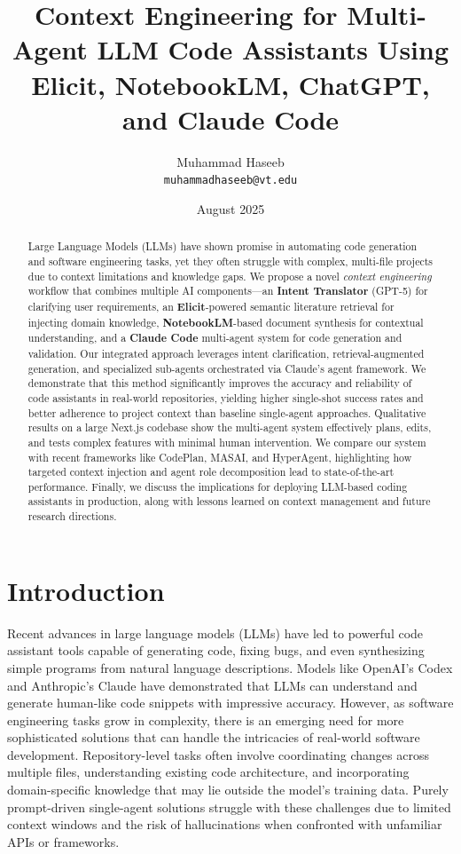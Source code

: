 \documentclass[11pt]{article}
\title{Context Engineering for Multi-Agent LLM Code Assistants Using Elicit, NotebookLM, ChatGPT, and Claude Code}
\author{Muhammad Haseeb\\
\texttt{muhammadhaseeb@vt.edu}}
\date{August 2025}
\begin{document}
\maketitle

\begin{abstract}
Large Language Models (LLMs) have shown promise in automating code generation and software engineering tasks, yet they often struggle with complex, multi-file projects due to context limitations and knowledge gaps. We propose a novel \textit{context engineering} workflow that combines multiple AI components—an \textbf{Intent Translator} (GPT-5) for clarifying user requirements, an \textbf{Elicit}-powered semantic literature retrieval for injecting domain knowledge, \textbf{NotebookLM}-based document synthesis for contextual understanding, and a \textbf{Claude Code} multi-agent system for code generation and validation. Our integrated approach leverages intent clarification, retrieval-augmented generation, and specialized sub-agents orchestrated via Claude's agent framework. We demonstrate that this method significantly improves the accuracy and reliability of code assistants in real-world repositories, yielding higher single-shot success rates and better adherence to project context than baseline single-agent approaches. Qualitative results on a large Next.js codebase show the multi-agent system effectively plans, edits, and tests complex features with minimal human intervention. We compare our system with recent frameworks like CodePlan, MASAI, and HyperAgent, highlighting how targeted context injection and agent role decomposition lead to state-of-the-art performance. Finally, we discuss the implications for deploying LLM-based coding assistants in production, along with lessons learned on context management and future research directions.
\end{abstract}

\section{Introduction}
Recent advances in large language models (LLMs) have led to powerful code assistant tools capable of generating code, fixing bugs, and even synthesizing simple programs from natural language descriptions. Models like OpenAI's Codex and Anthropic's Claude have demonstrated that LLMs can understand and generate human-like code snippets with impressive accuracy. However, as software engineering tasks grow in complexity, there is an emerging need for more sophisticated solutions that can handle the intricacies of real-world software development. Repository-level tasks often involve coordinating changes across multiple files, understanding existing code architecture, and incorporating domain-specific knowledge that may lie outside the model's training data. Purely prompt-driven single-agent solutions struggle with these challenges due to limited context windows and the risk of hallucinations when confronted with unfamiliar APIs or frameworks.
\end{document}
